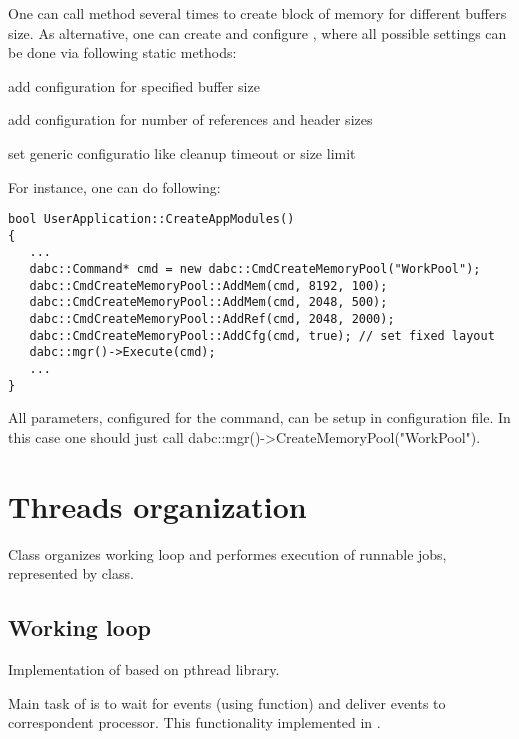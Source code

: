 One can call  method several times to create 
block of memory for different buffers size. As alternative, one can create and 
configure , where all possible settings can be 
done via following static methods:
\bbul
\item[\func{AddMem()}] add configuration for specified buffer size 
\item[\func{AddRef()}] add configuration for number of references and header sizes 
\item[\func{AddCfg()}] set generic configuratio like cleanup timeout or size limit 
\ebul

For instance, one can do following:

\begin{small}
\begin{verbatim}     
bool UserApplication::CreateAppModules()
{
   ...
   dabc::Command* cmd = new dabc::CmdCreateMemoryPool("WorkPool");
   dabc::CmdCreateMemoryPool::AddMem(cmd, 8192, 100);
   dabc::CmdCreateMemoryPool::AddMem(cmd, 2048, 500);
   dabc::CmdCreateMemoryPool::AddRef(cmd, 2048, 2000);
   dabc::CmdCreateMemoryPool::AddCfg(cmd, true); // set fixed layout
   dabc::mgr()->Execute(cmd);
   ...
}
\end{verbatim}     
\end{small}

All parameters, configured for the command, can be setup in configuration file.
In this case one should just call dabc::mgr()->CreateMemoryPool("WorkPool"). 


\section{Threads organization}

Class  organizes working loop and performes execution of
runnable jobs, represented by  class.


\subsection{Working loop}

Implementation of  based on pthread library.
 
Main task of  is to wait for events (using  function)
and deliver events to correspondent processor. This functionality implemented 
in .
 
